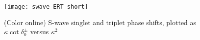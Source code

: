 \documentclass[preprint,showpacs,preprintnumbers,amsmath,amssymb]{revtex4}
\begin{document}
\begin{figure}[H]
	\centering
	\texttt{[image: swave-ERT-short]}
	\caption{(Color online) S-wave singlet and triplet phase shifts, plotted as $\kappa \cot \delta_0^\pm$ versus $\kappa^2$}
	\label{fig:swave-ERT-short}
\end{figure}


\end{document}
